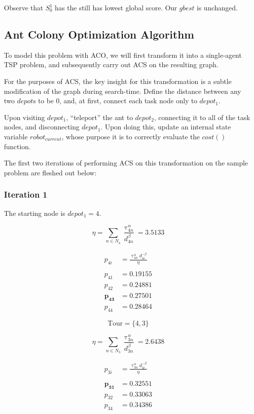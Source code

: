 \documentclass[a4paper]{article}
\begin{document}
Observe that $S_0^1$ has the still has lowest global score. Our $\mathit{gbest}$ is unchanged.

\subsection{Ant Colony Optimization Algorithm} %

To model this problem with ACO, we will first transform it into a single-agent TSP problem, and subsequently carry out ACS on the resulting graph.

For the purposes of ACS, the key insight for this transformation is a subtle modification of the graph during search-time. Define the distance between any two $depot$s to be 0, and, at first, connect each task node only to $depot_1$.

Upon visiting $depot_1$, ``teleport'' the ant to $depot_2$, connecting it to all of the task nodes, and disconnecting $depot_1$. Upon doing this, update an internal state variable $robot_{current}$, whose purpose it is to correctly evaluate the $cost()$ function.

The first two iterations of performing ACS on this transformation on the sample problem are fleshed out below:

\subsubsection{Iteration 1}

The starting node is $depot_1 = 4$.

$$
\eta = \sum_{n \in N_4} \frac{\uptau_{4n}^\alpha}{d_{4n}^\beta} = 3.5133
$$

\begin{align*}
p_{4i} &= \frac{\uptau_{4n}^\alpha d_{4i}^{-\beta}}{\eta} \\
\\
p_{41} &= 0.19155 \\
p_{42} &= 0.24881 \\
\mathbf{p_{43}} &= \mathbf{0.27501} \\
p_{44} &= 0.28464
\end{align*}

$$
\text{Tour} = \{4, 3\}
$$


$$
\eta = \sum_{n \in N_3} \frac{\uptau_{3n}^\alpha}{d_{3n}^\beta} = 2.6438
$$

\begin{align*}
p_{3i} &= \frac{\uptau_{3n}^\alpha d_{3i}^{-\beta}}{\eta} \\
\\
\mathbf{p_{31}} &= \mathbf{0.32551} \\
p_{32} &= 0.33063 \\
p_{34} &= 0.34386
\end{align*}
\end{document}

